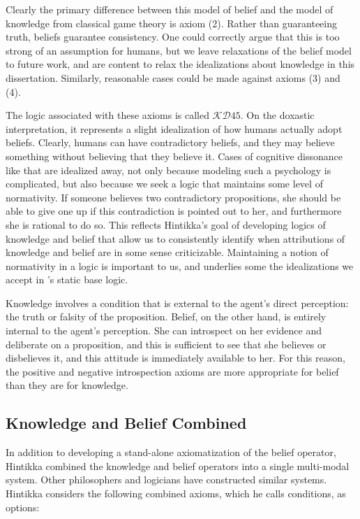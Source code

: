 Clearly the primary difference between this model of belief and the model of knowledge from classical game theory is axiom (2). Rather than guaranteeing truth, beliefs guarantee consistency. One could correctly argue that this is too strong of an assumption for humans, but we leave relaxations of the belief model to future work, and are content to relax the idealizations about knowledge in this dissertation. Similarly, reasonable cases could be made against axioms (3) and (4).

The logic associated with these axioms is called $\mathcal{KD}\mathit{45}$. On the doxastic interpretation, it represents a slight idealization of how humans actually adopt beliefs. Clearly, humans can have contradictory beliefs, and they may believe something without believing that they believe it. Cases of cognitive dissonance like that are idealized away, not only because modeling such a psychology is complicated, but also because we seek a logic that maintains some level of normativity. If someone believes two contradictory propositions, she should be able to give one up if this contradiction is pointed out to her, and furthermore she is rational to do so. This reflects Hintikka's goal of developing logics of knowledge and belief that allow us to consistently identify when attributions of knowledge and belief are in some sense criticizable. Maintaining a notion of normativity in a logic is important to us, and underlies some the idealizations we accept in \DASL's static base logic.

Knowledge involves a condition that is external to the agent's direct perception: the truth or falsity of the proposition. Belief, on the other hand, is entirely internal to the agent's perception. She can introspect on her evidence and deliberate on a proposition, and this is sufficient to see that she believes or disbelieves it, and this attitude is immediately available to her. For this reason, the positive and negative introspection axioms are more appropriate for belief than they are for knowledge. 

\subsection{Knowledge and Belief Combined}
In addition to developing a stand-alone axiomatization of the belief operator, Hintikka combined the knowledge and belief operators into a single multi-modal system. Other philosophers and logicians have constructed similar systems. Hintikka considers the following combined axioms, which he calls conditions, as options:

